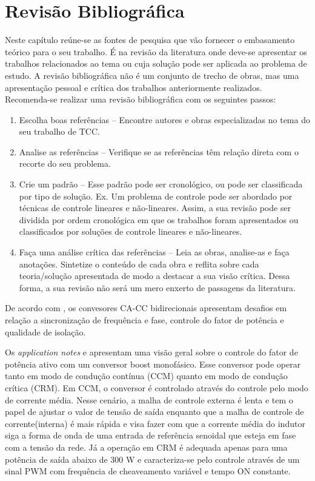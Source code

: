 \chapter{Revisão Bibliográfica}
Neste capítulo reúne-se as fontes de pesquisa que vão fornecer o embasamento teórico para o seu
trabalho. É na revisão da literatura onde deve-se apresentar os trabalhos relacionados ao tema
ou cuja solução pode ser aplicada ao problema de estudo. A revisão bibliográfica não é um
conjunto de trecho de obras, mas uma apresentação pessoal e crítica dos trabalhos anteriormente
realizados. Recomenda-se realizar uma revisão bibliográfica com os seguintes passos:
\begin{enumerate}
	\item Escolha boas referências – Encontre autores e obras especializadas no tema do seu trabalho de
	      TCC.
	\item Analise as referências – Verifique se as referências têm relação direta com o recorte do seu
	      problema.
	\item Crie um padrão – Esse padrão pode ser cronológico, ou pode ser classificada por tipo de
	      solução. Ex. Um problema de controle pode ser abordado por técnicas de controle lineares e
	      não-lineares. Assim, a sua revisão pode ser dividida por ordem cronológica em que os trabalhos
	      foram apresentados ou classificados por soluções de controle lineares e não-lineares.
	\item Faça uma análise crítica das referências – Leia as obras, analise-as e faça anotações.
	      Sintetize o conteúdo de cada obra e reflita sobre cada teoria/solução apresentada de modo a
	      destacar a sua visão crítica. Dessa forma, a sua revisão não será um mero enxerto de passagens
	      da literatura.
\end{enumerate}

De acordo com \cite{Kumar:2021}, os convesores CA-CC bidirecionais apresentam desafios em
relação a sincronização de frequência e fase, controle do fator de potência e qualidade de
isolação.

Os \textit{application notes} \cite{onsemi_hbd853} e \cite{ti_zhcp224} apresentam uma visão
geral sobre o controle do fator de potência ativo com um conversor boost monofásico. Esse
conversor pode operar tanto em modo de condução contínua (CCM) quanto em modo de condução
crítica (CRM). Em CCM, o conversor é controlado através do controle pelo modo de corrente
média. Nesse cenário, a malha de controle externa é lenta e tem o papel de ajustar o valor de
tensão de saída enquanto que a malha de controle de corrente(interna) é mais rápida e visa
fazer com que a corrente média do indutor siga a forma de onda de uma entrada de referência
senoidal que esteja em fase com a tensão da rede. Já a operação em CRM é adequada apenas para
uma potência de saída abaixo de 300 W e caracteriza-se pelo controle através de um sinal PWM
com frequência de cheaveamento variável e tempo ON constante.

